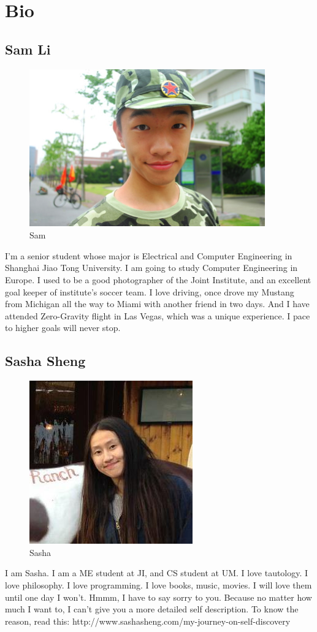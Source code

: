 \documentclass[paper=letter, fontsize=11pt]{scrartcl}
\numberwithin{equation}{section}		%
\numberwithin{figure}{section}			%
\numberwithin{table}{section}			%
\begin{document}
\pagebreak
\section{Bio}
\subsection{Sam Li}
\begin{figure}[H]
	\centering
	\includegraphics[scale=1]{lmt}
	\caption{Sam}
\end{figure}
I'm a senior student whose major is Electrical and Computer Engineering in Shanghai Jiao Tong University. I am going to study Computer Engineering in Europe. I used to be a good photographer of the Joint Institute, and an excellent goal keeper of institute's soccer team. I love driving, once drove my Mustang from Michigan all the way to Miami with another friend in two days. And I have attended Zero-Gravity flight in Las Vegas, which was a unique experience. I pace to higher goals will never stop.
\pagebreak
\subsection{Sasha Sheng}
\begin{figure}[H]
	\centering
	\includegraphics[scale=1]{Profile}
	\caption{Sasha}
\end{figure}
I am Sasha. I am a ME student at JI, and CS student at UM. I love tautology. I love philosophy. I love programming. I love books, music, movies. I will love them until one day I won't. Hmmm, I have to say sorry to you. Because no matter how much I want to, I can't give you a more detailed self description. To know the reason, read this: http://www.sashasheng.com/my-journey-on-self-discovery
\pagebreak
\end{document}
